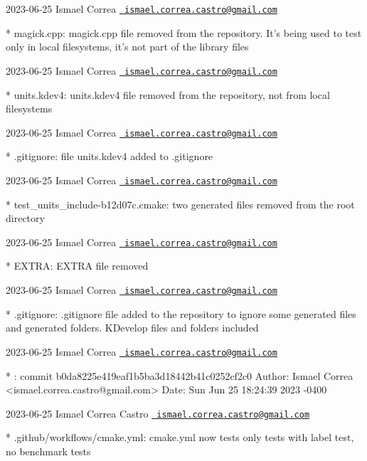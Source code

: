  2023-\/06-\/25 Ismael Correa \href{mailto:ismael.correa.castro@gmail.com}{\texttt{ ismael.\+correa.\+castro@gmail.\+com}} \begin{DoxyVerb}* magick.cpp: magick.cpp file removed from the repository. It's
being used to test only in local filesystems, it's not part of the
library files
\end{DoxyVerb}
 2023-\/06-\/25 Ismael Correa \href{mailto:ismael.correa.castro@gmail.com}{\texttt{ ismael.\+correa.\+castro@gmail.\+com}} \begin{DoxyVerb}* units.kdev4: units.kdev4 file removed from the repository, not
from local filesystems
\end{DoxyVerb}
 2023-\/06-\/25 Ismael Correa \href{mailto:ismael.correa.castro@gmail.com}{\texttt{ ismael.\+correa.\+castro@gmail.\+com}} \begin{DoxyVerb}* .gitignore: file units.kdev4 added to .gitignore
\end{DoxyVerb}
 2023-\/06-\/25 Ismael Correa \href{mailto:ismael.correa.castro@gmail.com}{\texttt{ ismael.\+correa.\+castro@gmail.\+com}} \begin{DoxyVerb}* test_units_include-b12d07c.cmake: two generated files removed from
the root directory
\end{DoxyVerb}
 2023-\/06-\/25 Ismael Correa \href{mailto:ismael.correa.castro@gmail.com}{\texttt{ ismael.\+correa.\+castro@gmail.\+com}} \begin{DoxyVerb}* EXTRA: EXTRA file removed
\end{DoxyVerb}
 2023-\/06-\/25 Ismael Correa \href{mailto:ismael.correa.castro@gmail.com}{\texttt{ ismael.\+correa.\+castro@gmail.\+com}} \begin{DoxyVerb}* .gitignore: .gitignore file added to the repository to ignore some
generated files and generated folders. KDevelop files and folders
included
\end{DoxyVerb}
 2023-\/06-\/25 Ismael Correa \href{mailto:ismael.correa.castro@gmail.com}{\texttt{ ismael.\+correa.\+castro@gmail.\+com}} \begin{DoxyVerb}* : commit b0da8225e419eaf1b5ba3d18442b41c0252cf2c0 Author: Ismael
Correa <ismael.correa.castro@gmail.com> Date:   Sun Jun 25 18:24:39
2023 -0400
\end{DoxyVerb}
 2023-\/06-\/25 Ismael Correa Castro \href{mailto:ismael.correa.castro@gmail.com}{\texttt{ ismael.\+correa.\+castro@gmail.\+com}} \begin{DoxyVerb}* .github/workflows/cmake.yml: cmake.yml now tests only tests with
label test, no benchmark tests
\end{DoxyVerb}
